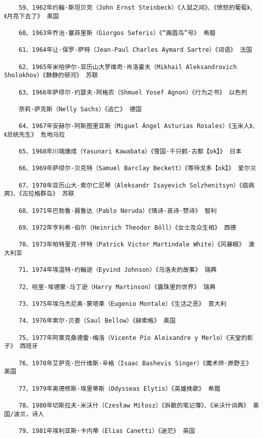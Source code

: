 \documentclass[UTF8]{../RepresentationUniverse}
\begin{document}
\begin{lstlisting}
    59、1962年约翰·斯坦贝克（John Ernst Steinbeck）《人鼠之间》、《愤怒的葡萄》、《月亮下去了》 美国
    
    60、1963年乔治·塞菲里斯（Giorgos Seferis）《“画眉鸟”号》 希腊
    
    61、1964年让·保罗·萨特（Jean-Paul Charles Aymard Sartre）《词语》 法国
    
    62、1965年米哈伊尔·亚历山大罗维奇·肖洛霍夫（Mikhail Aleksandrovich Sholokhov）《静静的顿河》 苏联
    
    63、1966年萨缪尔·约瑟夫·阿格农（Shmuel Yosef Agnon）《行为之书》 以色列
    
    奈莉·萨克斯（Nelly Sachs）《逃亡》 德国
    
    64、1967年安赫尔·阿斯图里亚斯（Miguel Ángel Asturias Rosales）《玉米人》、《总统先生》 危地马拉
    
    65、1968年川端康成（Yasunari Kawabata）《雪国·千只鹤·古都【ok】》 日本
    
    66、1969年萨缪尔·贝克特（Samuel Barclay Beckett）《等待戈多【ok】》 爱尔兰
    
    67、1970年亚历山大·索尔仁尼琴（Aleksandr Isayevich Solzhenitsyn）《癌病房》、《古拉格群岛》 苏联
    
    68、1971年巴勃鲁·聂鲁达（Pablo Neruda）《情诗·哀诗·赞诗》 智利
    
    69、1972年亨利希·伯尔（Heinrich Theodor Böll）《女士及众生相》 西德
    
    70、1973年帕特里克·怀特（Patrick Victor Martindale White）《风暴眼》 澳大利亚
    
    71、1974年埃温特·约翰逊（Eyvind Johnson）《乌洛夫的故事》 瑞典
    
    72、哈里·埃德蒙·马丁逊（Harry Martinson）《露珠里的世界》 瑞典
    
    73、1975年埃乌杰尼奥·蒙塔莱（Eugenio Montale）《生活之恶》 意大利
    
    74、1976年索尔·贝娄（Saul Bellow）《赫索格》 美国
    
    75、1977年阿莱克桑德雷·梅洛（Vicente Pío Aleixandre y Merlo）《天堂的影子》 西班牙
    
    76、1978年艾萨克·巴什维斯·辛格（Isaac Bashevis Singer）《魔术师·原野王》 美国
    
    77、1979年奥德修斯·埃里蒂斯（Odysseas Elytis）《英雄挽歌》 希腊
    
    78、1980年切斯拉夫·米沃什（Czesław Miłosz）《拆散的笔记簿》、《米沃什词典》 美国/波兰，诗人
    
    79、1981年埃利亚斯·卡内蒂（Elias Canetti）《迷茫》 英国
    

\end{lstlisting}
\end{document}
